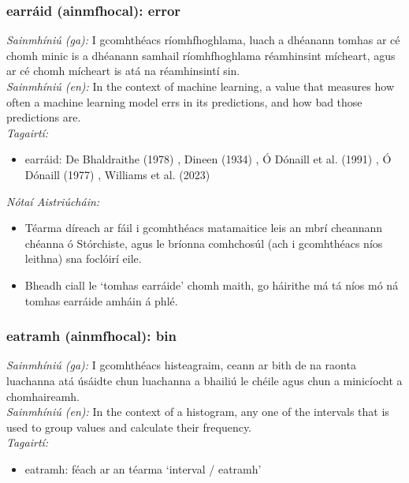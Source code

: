 \documentclass{article}
\begin{document}
\subsubsection*{earráid (ainmfhocal): error}
 \noindent \textit{Sainmhíniú (ga):} I gcomhthéacs ríomhfhoghlama, luach a dhéanann tomhas ar cé chomh minic is a dhéanann samhail ríomhfhoghlama réamhinsint mícheart, agus ar cé chomh mícheart is atá na réamhinsintí sin.
\\
 \noindent \textit{Sainmhíniú (en):} In the context of machine learning, a value that measures how often a machine learning model errs in its predictions, and how bad those predictions are.
\\
 \noindent \textit{Tagairtí:}
\begin{itemize}
	\item earráid: De Bhaldraithe (1978) \cite{de-bhaldraithe}, Dineen (1934) \cite{dineen}, Ó Dónaill et al. (1991) \cite{focloir-beag}, Ó Dónaill (1977) \cite{odonaill}, Williams et al. (2023) \cite{storchiste}
\end{itemize}

 \noindent \textit{Nótaí Aistriúcháin:}
\begin{itemize}
	\item Téarma díreach ar fáil i gcomhthéacs matamaitice leis an mbrí cheannann chéanna ó Stórchiste, agus le bríonna comhchosúl (ach i gcomhthéacs níos leithna) sna foclóirí eile.
	\item Bheadh ciall le `tomhas earráide' chomh maith, go háirithe má tá níos mó ná tomhas earráide amháin á phlé.
\end{itemize}


\subsubsection*{eatramh (ainmfhocal): bin}
 \noindent \textit{Sainmhíniú (ga):} I gcomhthéacs histeagraim, ceann ar bith de na raonta luachanna atá úsáidte chun luachanna a bhailiú le chéile agus chun a minicíocht a chomhaireamh.
\\
 \noindent \textit{Sainmhíniú (en):} In the context of a histogram, any one of the intervals that is used to group values and calculate their frequency.
\\
 \noindent \textit{Tagairtí:}
\begin{itemize}
	\item eatramh: féach ar an téarma `interval / eatramh'
\end{itemize}
\end{document}
